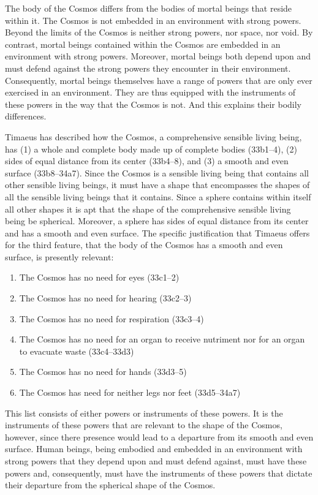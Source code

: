 The body of the Cosmos differs from the bodies of mortal beings that reside within it. The Cosmos is not embedded in an environment with strong powers. Beyond the limits of the Cosmos is neither strong powers, nor space, nor void. By contrast, mortal beings contained within the Cosmos are embedded in an environment with strong powers. Moreover, mortal beings both depend upon and must defend against the strong powers they encounter in their environment. Consequently, mortal beings themselves have a range of powers that are only ever exercised in an environment. They are thus equipped with the instruments of these powers in the way that the Cosmos is not. And this explains their bodily differences.

Timaeus has described how the Cosmos, a comprehensive sensible living being, has (1) a whole and complete body made up of complete bodies (33b1–4), (2) sides of equal distance from its center (33b4–8), and (3) a smooth and even surface (33b8–34a7). Since the Cosmos is a sensible living being that contains all other sensible living beings, it must have a shape that encompasses the shapes of all the sensible living beings that it contains. Since a sphere contains within itself all other shapes it is apt that the shape of the comprehensive sensible living being be spherical. Moreover, a sphere has sides of equal distance from its center and has a smooth and even surface. The specific justification that Timaeus offers for the third feature, that the body of the Cosmos has a smooth and even surface, is presently relevant:
\begin{enumerate}[(1)]
	\item The Cosmos has no need for eyes (33c1–2)
	\item The Cosmos has no need for hearing (33c2–3)
	\item The Cosmos has no need for respiration (33c3–4)
	\item The Cosmos has no need for an organ to receive nutriment nor for an organ to evacuate waste (33c4–33d3)
	\item The Cosmos has no need for hands (33d3–5)
	\item The Cosmos has need for neither legs nor feet (33d5–34a7)
\end{enumerate}
This list consists of either powers or instruments of these powers. It is the instruments of these powers that are relevant to the shape of the Cosmos, however, since there presence would lead to a departure from its smooth and even surface. Human beings, being embodied and embedded in an environment with strong powers that they depend upon and must defend against, must have these powers and, consequently, must have the instruments of these powers that dictate their departure from the spherical shape of the Cosmos.

